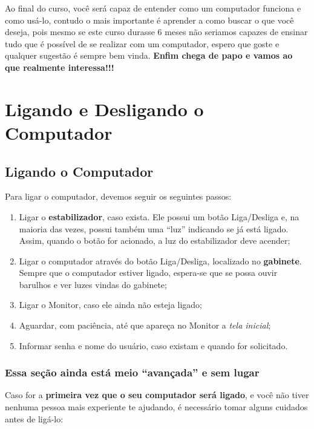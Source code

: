 \documentclass[hidelinks,12pt]{article}
\begin{document}
 Ao final do curso, você será capaz de entender como um computador funciona e como usá-lo, contudo o mais importante é aprender a como buscar o que você deseja, pois mesmo se este curso durasse 6 meses não seriamos capazes de ensinar tudo que é possível de se realizar com um computador, espero que goste e qualquer sugestão é sempre bem vinda. \textbf{Enfim chega de papo e vamos ao que realmente interessa!!!}


\section{Ligando e Desligando o Computador}
\label{Ligando e Desligando o Computador}

\subsection{Ligando o Computador}
\label{Ligando o Computador}

	
Para ligar o computador, devemos seguir os seguintes passos:
	
\begin{enumerate}
	\item Ligar o \textbf{estabilizador}, caso exista. Ele possui um botão Liga/Desliga e, na maioria das vezes, possui também uma ``luz'' indicando se já está ligado. Assim, quando o botão for acionado, a luz do estabilizador deve acender;

	\item Ligar o computador através do botão Liga/Desliga, localizado no \textbf{gabinete}. Sempre que o computador estiver ligado, espera-se que se possa ouvir barulhos e ver luzes vindas do gabinete;

    \item Ligar o Monitor, caso ele ainda não esteja ligado;

	\item Aguardar, com paciência, até que apareça no Monitor a \emph{tela inicial};

	\item Informar senha e nome do usuário, caso existam e quando for solicitado.
\end{enumerate}


\subsubsection{Essa seção ainda está meio ``avançada'' e sem lugar}

Caso for a \textbf{primeira vez que o seu computador será ligado}, e você não tiver nenhuma pessoa mais experiente te ajudando, é necessário tomar alguns cuidados antes de ligá-lo:
\end{document}
